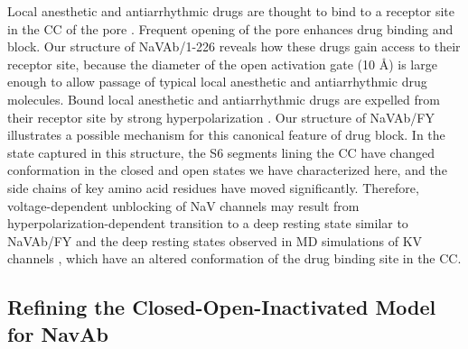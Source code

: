 \begin{refsection}
{Local anesthetic and antiarrhythmic drugs are thought to bind to a receptor site in the CC of the pore \cite{Hille:2001tw}. Frequent opening of the pore enhances drug binding and block. Our structure of NaVAb/1-226 reveals how these drugs gain access to their receptor site, because the diameter of the open activation gate (10 \AA) is large enough to allow passage of typical local anesthetic and antiarrhythmic drug molecules. Bound local anesthetic and antiarrhythmic drugs are expelled from their receptor site by strong hyperpolarization \cite{Hille:1977td,Courtney:1975uu}. Our structure of NaVAb/FY illustrates a possible mechanism for this canonical feature of drug block. In the state captured in this structure, the S6 segments lining the CC have changed conformation in the closed and open states we have characterized here, and the side chains of key amino acid residues have moved significantly. Therefore, voltage-dependent unblocking of NaV channels may result from hyperpolarization-dependent transition to a deep resting state similar to NaVAb/FY and the deep resting states observed in MD simulations of KV channels \cite{Jensen:2012ee}, which have an altered conformation of the drug binding site in the CC.

\subsection{Refining the Closed-Open-Inactivated Model for NavAb}

}
\end{refsection}
